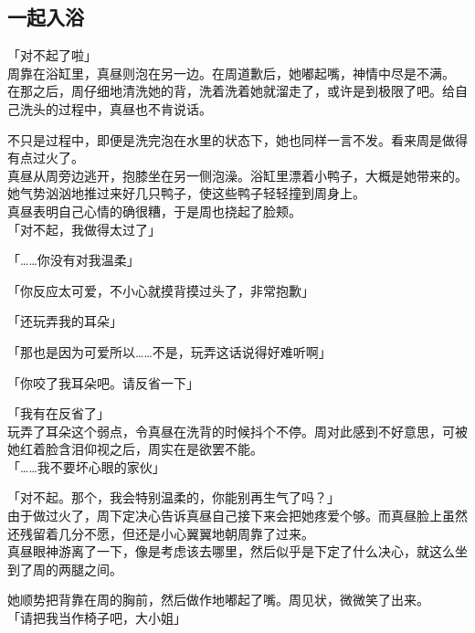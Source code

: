 \subsection{一起入浴}

「对不起了啦」\\

周靠在浴缸里，真昼则泡在另一边。在周道歉后，她嘟起嘴，神情中尽是不满。\\

在那之后，周仔细地清洗她的背，洗着洗着她就溜走了，或许是到极限了吧。给自己洗头的过程中，真昼也不肯说话。

不只是过程中，即便是洗完泡在水里的状态下，她也同样一言不发。看来周是做得有点过火了。\\

真昼从周旁边逃开，抱膝坐在另一侧泡澡。浴缸里漂着小鸭子，大概是她带来的。她气势汹汹地推过来好几只鸭子，使这些鸭子轻轻撞到周身上。\\

真昼表明自己心情的确很糟，于是周也挠起了脸颊。\\

「对不起，我做得太过了」

「……你没有对我温柔」

「你反应太可爱，不小心就摸背摸过头了，非常抱歉」

「还玩弄我的耳朵」

「那也是因为可爱所以……不是，玩弄这话说得好难听啊」

「你咬了我耳朵吧。请反省一下」

「我有在反省了」\\

玩弄了耳朵这个弱点，令真昼在洗背的时候抖个不停。周对此感到不好意思，可被她红着脸含泪仰视之后，周实在是欲罢不能。\\

「……我不要坏心眼的家伙」

「对不起。那个，我会特别温柔的，你能别再生气了吗？」\\

由于做过火了，周下定决心告诉真昼自己接下来会把她疼爱个够。而真昼脸上虽然还残留着几分不愿，但还是小心翼翼地朝周靠了过来。\\

真昼眼神游离了一下，像是考虑该去哪里，然后似乎是下定了什么决心，就这么坐到了周的两腿之间。

她顺势把背靠在周的胸前，然后做作地嘟起了嘴。周见状，微微笑了出来。\\

「请把我当作椅子吧，大小姐」

